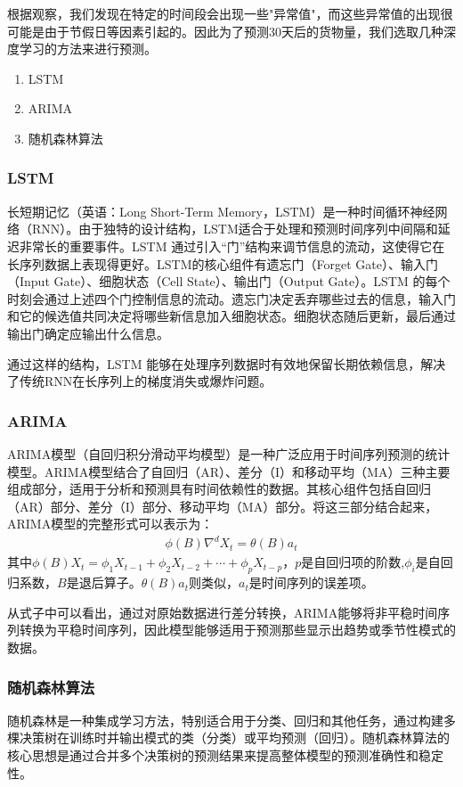 \documentclass[UTF8]{article}%
\begin{document}
根据观察，我们发现在特定的时间段会出现一些"异常值"，而这些异常值的出现很可能是由于节假日等因素引起的。因此为了预测30天后的货物量，我们选取几种深度学习的方法来进行预测。
\begin{enumerate}
	\item LSTM
	\item ARIMA
	\item 随机森林算法
\end{enumerate}
\subsubsection{LSTM}
长短期记忆（英语：Long Short-Term Memory，LSTM）是一种时间循环神经网络（RNN）。由于独特的设计结构，LSTM适合于处理和预测时间序列中间隔和延迟非常长的重要事件。LSTM 通过引入“门”结构来调节信息的流动，这使得它在长序列数据上表现得更好。LSTM的核心组件有遗忘门（Forget Gate）、输入门（Input Gate）、细胞状态（Cell State）、输出门（Output Gate）。LSTM 的每个时刻会通过上述四个门控制信息的流动。遗忘门决定丢弃哪些过去的信息，输入门和它的候选值共同决定将哪些新信息加入细胞状态。细胞状态随后更新，最后通过输出门确定应输出什么信息。

通过这样的结构，LSTM 能够在处理序列数据时有效地保留长期依赖信息，解决了传统RNN在长序列上的梯度消失或爆炸问题。

\subsubsection{ARIMA}
ARIMA模型（自回归积分滑动平均模型）是一种广泛应用于时间序列预测的统计模型。ARIMA模型结合了自回归（AR）、差分（I）和移动平均（MA）三种主要组成部分，适用于分析和预测具有时间依赖性的数据。其核心组件包括自回归（AR）部分、差分（I）部分、移动平均（MA）部分。将这三部分结合起来，ARIMA模型的完整形式可以表示为：
\begin{align*}
	\phi (B)\nabla^d X_t = \theta(B)a_t
\end{align*}
其中\(\phi (B) X_t = \phi_1X_{t-1}+\phi_2X_{t-2}+\cdots+\phi_p X_{t-p}\)，$p$是自回归项的阶数,\(\phi_i\)是自回归系数，\(B\)是退后算子。\(\theta(B) 	a_t\)则类似，\(a_t\)是时间序列的误差项。

从式子中可以看出，通过对原始数据进行差分转换，ARIMA能够将非平稳时间序列转换为平稳时间序列，因此模型能够适用于预测那些显示出趋势或季节性模式的数据。
\subsubsection{随机森林算法}
随机森林是一种集成学习方法，特别适合用于分类、回归和其他任务，通过构建多棵决策树在训练时并输出模式的类（分类）或平均预测（回归）。随机森林算法的核心思想是通过合并多个决策树的预测结果来提高整体模型的预测准确性和稳定性。
\end{document}
